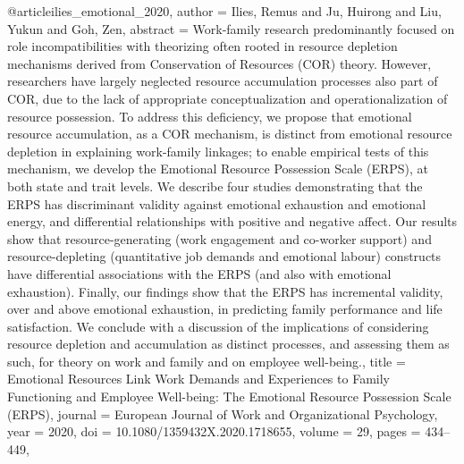 @article{ilies_emotional_2020,
  author = {Ilies, Remus and Ju, Huirong and Liu, Yukun and Goh, Zen},
  abstract = {Work-family research predominantly focused on role incompatibilities with theorizing often rooted in resource depletion mechanisms derived from Conservation of Resources (COR) theory. However, researchers have largely neglected resource accumulation processes also part of COR, due to the lack of appropriate conceptualization and operationalization of resource possession. To address this deficiency, we propose that emotional resource accumulation, as a COR mechanism, is distinct from emotional resource depletion in explaining work-family linkages; to enable empirical tests of this mechanism, we develop the Emotional Resource Possession Scale (ERPS), at both state and trait levels. We describe four studies demonstrating that the ERPS has discriminant validity against emotional exhaustion and emotional energy, and differential relationships with positive and negative affect. Our results show that resource-generating (work engagement and co-worker support) and resource-depleting (quantitative job demands and emotional labour) constructs have differential associations with the ERPS (and also with emotional exhaustion). Finally, our findings show that the ERPS has incremental validity, over and above emotional exhaustion, in predicting family performance and life satisfaction. We conclude with a discussion of the implications of considering resource depletion and accumulation as distinct processes, and assessing them as such, for theory on work and family and on employee well-being.},
  title = {{Emotional} {Resources} {Link} {Work} {Demands} {and} {Experiences} {to} {Family} {Functioning} {and} {Employee} {Well-being}: {The} {Emotional} {Resource} {Possession} {Scale} {(ERPS})},
  journal = {European Journal of Work and Organizational Psychology},
  year = {2020},
  doi = {10.1080/1359432X.2020.1718655},
  volume = {29},
  pages = {434--449},
}

